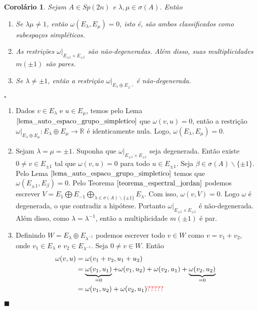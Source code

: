 \documentclass[12pt]{book}
\newtheorem{corolario}[teorema]{Corolário}
\newenvironment{prova}[1]{$\square$ #1}{\hfill$\blacksquare$}
\newcommand{\complementar}[2]{#1 \backslash #2}
\newcommand{\formaSimpletica}[2]{\omega(#1, #2)}
\newcommand{\gruposimpletico}[1]{Sp(#1)}
\newcommand{\real}[1]{\mathbb{R}^{#1}}
\newcommand{\reta}{\real{}}
\newcommand{\vermelho}[1]{{\color{red}#1}}
\begin{document}
	\begin{corolario}\label{corolario_restricao_forma_simpletica}
		Sejam $A \in \gruposimpletico{2n}$ e $\lambda, \mu \in \sigma(A)$. Então 
		\begin{enumerate}
			\item Se $\lambda\mu \neq 1$, então $\formaSimpletica{E_{\lambda}}{E_{\mu}} = 0$, isto é, são ambos classificados como subespaços simpléticos.
			\item As restrições $\omega|_{E_{\pm 1}\times E_{\pm 1}}$ são não-degeneradas. Além disso, suas multiplicidades $m(\pm 1)$ são pares.
			\item Se $\lambda \neq \pm 1$, então a restrição $\omega|_{E_{\lambda} \oplus E_{\lambda^{-1}}}$ é não-degenerada.
		\end{enumerate}
	\end{corolario}
	\begin{prova}
		\begin{enumerate}
			\item Dados $v \in E_{\lambda}$ e $u \in E_{\mu}$, temos pelo Lema $\ref{lema_auto_espaco_grupo_simpletico}$ que $\formaSimpletica{v}{u} = 0$, então a restrição $\omega|_{E_{\lambda} \oplus E_{\mu}}:E_{\lambda} \oplus E_{\mu}\to \reta$ é identicamente nula. Logo, $\formaSimpletica{E_{\lambda} }{E_{\mu}} = 0$.
			
			\item  Sejam $\lambda = \mu =\pm 1$. Suponha que $\omega|_{E_{\pm 1} \times E_{\pm 1}}$ seja degenerada. Então existe $0\neq v \in E_{\pm 1}$ tal que $\omega(v, u) = 0$ para todo $u \in E_{\pm 1}$. Seja $\beta \in \complementar{\sigma(A)}{\{\pm 1 \}}$. Pelo Lema $\ref{lema_auto_espaco_grupo_simpletico}$ temos que $\formaSimpletica{E_{\pm 1}}{E_{\beta}} = 0$. Pelo Teorema $\ref{teorema_espectral_jordan}$ podemos escrever $V = E_{1} \bigoplus E_{-1} \bigoplus_{\lambda \in \complementar{\sigma(A)}{ \{\pm 1\}  }}E_{\lambda}$. Com isso, $\formaSimpletica{v}{V} = 0$. Logo $\omega$ é degenerada, o que contradiz a hipótese. Portanto $\omega|_{E_{\pm 1} \times E_{\pm 1}}$ é não-degenerada. Além disso, como $\lambda = \lambda^{-1}$, então a multiplicidade $m(\pm 1)$ é par.
			
			\item Definindo $W = E_{\lambda}\oplus E_{\lambda^{-1}}$ podemos escrever todo $v\in W$ como $v = v_{1}+v_{2}$, onde $v_{1} \in E_{\lambda}$ e $v_{2} \in E_{\lambda^{-1}}$. Seja $0 \neq v \in W$. Então 
			$$
			\begin{aligned}
			\formaSimpletica{v}{u} 
			&=
			\formaSimpletica{v_{1}+v_{2}}{u_{1}+u_{2}}
			\\
			&= \underbrace{\formaSimpletica{v_{1}}{u_{1}}}_{=0}+\formaSimpletica{v_{1}}{u_{2}}+\formaSimpletica{v_{2}}{u_{1}}+\underbrace{\formaSimpletica{v_{2}}{u_{2}}}_{=0}
			\\
			&=\formaSimpletica{v_{1}}{u_{2}}+\formaSimpletica{v_{2}}{u_{1}}
			\vermelho{?????}
			\end{aligned}
			$$
		\end{enumerate}
	\end{prova}
	
\end{document}
